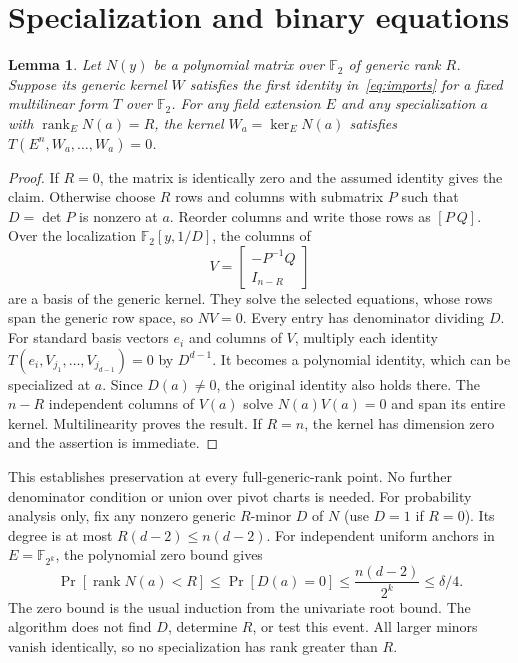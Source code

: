 \documentclass[11pt]{article}
\newtheorem{lemma}[theorem]{Lemma}
\theoremstyle{remark}\newtheorem{remark}[theorem]{Remark}
\newcommand{\F}{\mathbb F}
\newcommand{\rank}{\operatorname{rank}}
\begin{document}
\section{Specialization and binary equations}
\begin{lemma}\label{lem:special}
Let $N(y)$ be a polynomial matrix over $\F_2$ of generic rank $R$. Suppose its generic kernel $W$ satisfies the first identity in~\eqref{eq:imports} for a fixed multilinear form $T$ over $\F_2$.
For any field extension $E$ and any specialization $a$ with $\rank_E N(a)=R$, the kernel $W_a=\ker_E N(a)$ satisfies
$T(E^n,W_a,\ldots,W_a)=0$.
\end{lemma}
\begin{proof}
If $R=0$, the matrix is identically zero and the assumed identity gives the claim. Otherwise choose $R$ rows and columns with submatrix $P$ such that $D=\det P$ is nonzero at $a$. Reorder columns and write those rows as $[P\ Q]$. Over the localization $\F_2[y,1/D]$, the columns of
\[
 V=\begin{bmatrix}-P^{-1}Q\\I_{n-R}\end{bmatrix}
\]
are a basis of the generic kernel. They solve the selected equations, whose rows span the generic row space, so $NV=0$. Every entry has denominator dividing $D$.
For standard basis vectors $e_i$ and columns of $V$, multiply each identity
$T(e_i,V_{j_1},\ldots,V_{j_{d-1}})=0$ by $D^{d-1}$.
It becomes a polynomial identity, which can be specialized at $a$. Since $D(a)\ne0$, the original identity also holds there.
The $n-R$ independent columns of $V(a)$ solve $N(a)V(a)=0$ and span its entire kernel. Multilinearity proves the result. If $R=n$, the kernel has dimension zero and the assertion is immediate.
\end{proof}

This establishes preservation at every full-generic-rank point. No further denominator condition or union over pivot charts is needed.
For probability analysis only, fix any nonzero generic $R$-minor $D$ of $N$ (use $D=1$ if $R=0$). Its degree is at most $R(d-2)\le n(d-2)$.
For independent uniform anchors in $E=\F_{2^k}$, the polynomial zero bound gives
\begin{equation}\label{eq:rankprob}
 \Pr[\rank N(a)<R]\le\Pr[D(a)=0]
 \le\frac{n(d-2)}{2^k}\le\delta/4.
\end{equation}
The zero bound is the usual induction from the univariate root bound. The algorithm does not find $D$, determine $R$, or test this event. All larger minors vanish identically, so no specialization has rank greater than $R$.
\end{document}
